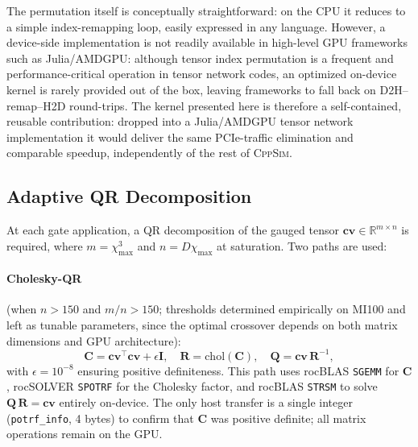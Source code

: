 \documentclass[11pt]{article}
\newcommand{\chimax}{\chi_{\mathrm{max}}}
\begin{document}
The permutation itself is conceptually straightforward: on the CPU it reduces
to a simple index-remapping loop, easily expressed in any language.
However, a device-side implementation is not readily available in high-level
GPU frameworks such as Julia/AMDGPU: although tensor index permutation is a
frequent and performance-critical operation in tensor network codes, an
optimized on-device kernel is rarely provided out of the box, leaving
frameworks to fall back on D2H--remap--H2D round-trips.
The kernel presented here is therefore a self-contained, reusable contribution:
dropped into a Julia/AMDGPU tensor network implementation it would deliver the
same PCIe-traffic elimination and comparable speedup, independently of the rest
of \textsc{CppSim}.

\subsection{Adaptive QR Decomposition}
\label{sec:qr}

At each gate application, a QR decomposition of the gauged tensor
$\mathbf{cv} \in \mathbb{R}^{m \times n}$ is required, where
$m = \chimax^3$ and $n = D\chimax$ at saturation. Two paths are used:

\paragraph{Cholesky-QR~\citep{golub2013matrix}} (when $n > 150$ and $m/n > 150$;
thresholds determined empirically on MI100 and left as tunable parameters,
since the optimal crossover depends on both matrix dimensions and GPU architecture):
\begin{equation}
  \mathbf{C} = \mathbf{cv}^\top \mathbf{cv} + \epsilon \mathbf{I}, \quad
  \mathbf{R} = \mathrm{chol}(\mathbf{C}), \quad
  \mathbf{Q} = \mathbf{cv}\, \mathbf{R}^{-1},
  \label{eq:cholqr}
\end{equation}
with $\epsilon = 10^{-8}$ ensuring positive definiteness. This path uses
rocBLAS \texttt{SGEMM} for $\mathbf{C}$, rocSOLVER \texttt{SPOTRF} for the
Cholesky factor, and rocBLAS \texttt{STRSM} to solve
$\mathbf{Q}\,\mathbf{R} = \mathbf{cv}$ entirely on-device.
The only host transfer is a single integer (\texttt{potrf\_info}, 4 bytes)
to confirm that $\mathbf{C}$ was positive definite; all matrix operations
remain on the GPU.
\end{document}
